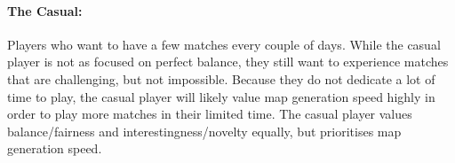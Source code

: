\paragraph{The Casual:} Players who want to have a few matches every couple of days. While the casual player is not as focused on perfect balance, they still want to experience matches that are challenging, but not impossible. Because they do not dedicate a lot of time to play, the casual player will likely value map generation speed highly in order to play more matches in their limited time. The casual player values balance/fairness and interestingness/novelty equally, but prioritises map generation speed.

\subsubsection{}

